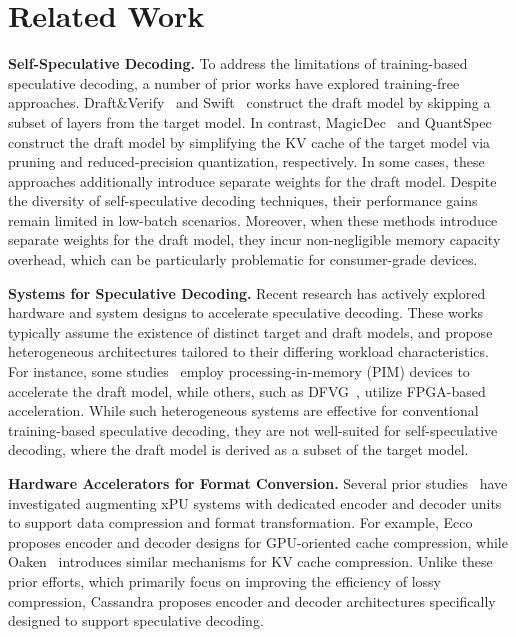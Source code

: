 \section{Related Work}
\label{section_8_1}

\textbf{Self-Speculative Decoding.} To address the limitations of training-based speculative decoding, a number of prior works have explored training-free approaches. Draft\&Verify~\cite{Draft&Verify} and Swift~\cite{swift_specdec} construct the draft model by skipping a subset of layers from the target model. In contrast, MagicDec~\cite{MagicDec} and QuantSpec~\cite{QuantSpec} construct the draft model by simplifying the KV cache of the target model via pruning and reduced-precision quantization, respectively. In some cases, these approaches additionally introduce separate weights for the draft model. Despite the diversity of self-speculative decoding techniques, their performance gains remain limited in low-batch scenarios. Moreover, when these methods introduce separate weights for the draft model, they incur non-negligible memory capacity overhead, which can be particularly problematic for consumer-grade devices.

\textbf{Systems for Speculative Decoding.} Recent research has actively explored hardware and system designs to accelerate speculative decoding. These works typically assume the existence of distinct target and draft models, and propose heterogeneous architectures tailored to their differing workload characteristics. For instance, some studies~\cite{SpecPIM, LP-spec, ADAPTIVE_DRAFT_LENGTH} employ processing-in-memory (PIM) devices to accelerate the draft model, while others, such as DFVG~\cite{Draft_FPGA_DFVG}, utilize FPGA-based acceleration. While such heterogeneous systems are effective for conventional training-based speculative decoding, they are not well-suited for self-speculative decoding, where the draft model is derived as a subset of the target model.

\textbf{Hardware Accelerators for Format Conversion.} Several prior studies~\cite{ecco, oaken, Deca} have investigated augmenting xPU systems with dedicated encoder and decoder units to support data compression and format transformation. For example, Ecco~\cite{ecco} proposes encoder and decoder designs for GPU-oriented cache compression, while Oaken~\cite{oaken} introduces similar mechanisms for KV cache compression. Unlike these prior efforts, which primarily focus on improving the efficiency of lossy compression, Cassandra proposes encoder and decoder architectures specifically designed to support speculative decoding.

